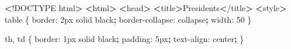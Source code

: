 \documentclass[]{book}
\newenvironment{Shaded}{\begin{snugshade}}{\end{snugshade}}
\newcommand{\KeywordTok}[1]{\textcolor[rgb]{0.13,0.29,0.53}{\textbf{#1}}}
\newcommand{\FunctionTok}[1]{\textcolor[rgb]{0.00,0.00,0.00}{#1}}
\newcommand{\OperatorTok}[1]{\textcolor[rgb]{0.81,0.36,0.00}{\textbf{#1}}}
\newcommand{\ExtensionTok}[1]{#1}
\newcommand{\NormalTok}[1]{#1}
\begin{document}
\begin{Shaded}
\begin{Highlighting}[]
\OperatorTok{<}\NormalTok{!}\ExtensionTok{DOCTYPE}\NormalTok{ html}\OperatorTok{>}         
\OperatorTok{<}\ExtensionTok{html}\OperatorTok{>}                  
    \OperatorTok{<}\FunctionTok{head}\OperatorTok{>}                                  
        \OperatorTok{<}\ExtensionTok{title}\OperatorTok{>}\NormalTok{Presidents}\OperatorTok{<}\NormalTok{/title}\OperatorTok{>}           
        \OperatorTok{<}\ExtensionTok{style}\OperatorTok{>}                             
            \ExtensionTok{table}\NormalTok{ \{                         }
                \ExtensionTok{border}\NormalTok{: 2px solid black}\KeywordTok{;}    
                \ExtensionTok{border-collapse}\NormalTok{: collapse}\KeywordTok{;}  
                \ExtensionTok{width}\NormalTok{: 50%}\KeywordTok{;}                 
\NormalTok{            \}                               }
                                            
            \ExtensionTok{th}\NormalTok{, td \{                        }
                \ExtensionTok{border}\NormalTok{: 1px solid black}\KeywordTok{;}    
                \ExtensionTok{padding}\NormalTok{: 5px}\KeywordTok{;}               
                \ExtensionTok{text-align}\NormalTok{: center}\KeywordTok{;}         
\NormalTok{            \}                               }
                                            
}
\end{Highlighting}
\end{Shaded}
\end{document}
